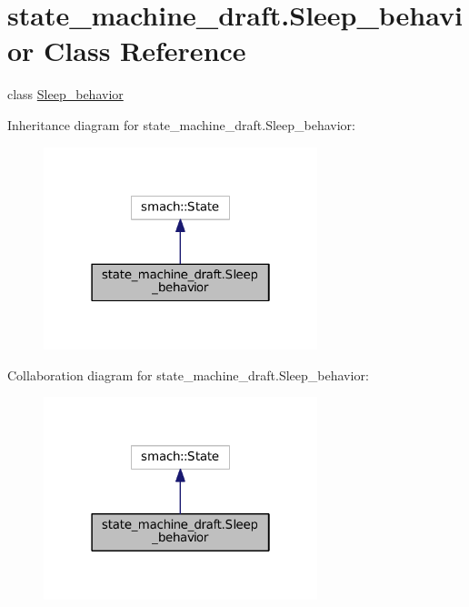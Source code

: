 \hypertarget{classstate__machine__draft_1_1Sleep__behavior}{}\section{state\+\_\+machine\+\_\+draft.\+Sleep\+\_\+behavior Class Reference}
\label{classstate__machine__draft_1_1Sleep__behavior}


class \hyperlink{classstate__machine__draft_1_1Sleep__behavior}{Sleep\+\_\+behavior}  




Inheritance diagram for state\+\_\+machine\+\_\+draft.\+Sleep\+\_\+behavior\+:\nopagebreak
\begin{figure}[H]
\begin{center}
\leavevmode
\includegraphics[width=226pt]{classstate__machine__draft_1_1Sleep__behavior__inherit__graph}
\end{center}
\end{figure}


Collaboration diagram for state\+\_\+machine\+\_\+draft.\+Sleep\+\_\+behavior\+:\nopagebreak
\begin{figure}[H]
\begin{center}
\leavevmode
\includegraphics[width=226pt]{classstate__machine__draft_1_1Sleep__behavior__coll__graph}
\end{center}
\end{figure}
